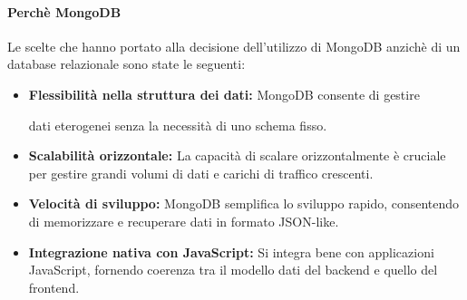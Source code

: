 \paragraph{Perchè MongoDB}

Le scelte che hanno portato alla decisione dell'utilizzo di MongoDB anzichè
di un database relazionale sono state le seguenti:

\begin{itemize}
      \item \textbf{Flessibilità nella struttura dei dati:} MongoDB consente di gestire

            dati eterogenei senza la necessità di uno schema fisso.

      \item \textbf{Scalabilità orizzontale:} La capacità di scalare orizzontalmente è
            cruciale per gestire grandi volumi di dati e carichi di traffico crescenti.

      \item \textbf{Velocità di sviluppo:} MongoDB semplifica lo sviluppo rapido,
            consentendo di memorizzare e recuperare dati in formato JSON-like.

      \item \textbf{Integrazione nativa con JavaScript:} Si integra bene con applicazioni
            JavaScript, fornendo coerenza tra il modello dati del backend e quello del frontend.
\end{itemize}








